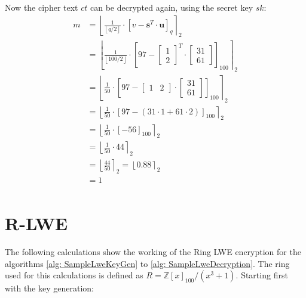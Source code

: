 Now the cipher text $ct$ can be decrypted again, using the secret key $sk$:
\begin{align*}
  m & = \left\lfloor \frac{1}{\left\lfloor q/2\right\rfloor} \cdot\left[v-\textbf{s}^T \cdot \textbf{u}\right]_{q} \right\rceil _2 \\
    & = \left\lfloor \frac{1}{\left\lfloor 100/2\right\rfloor} \cdot \left[97-
    \begin{bmatrix}
      1 \\
      2
    \end{bmatrix}^T
    \cdot
  \begin{bmatrix}
      31 \\
      61
    \end{bmatrix} \right]_{100}\right\rceil _2                                                                                       \\
    & = \left\lfloor \frac{1}{50} \cdot \left[97-
    \begin{bmatrix}
      1 & 2 
    \end{bmatrix}
    \cdot 
  \begin{bmatrix}
      31 \\ 
      61
    \end{bmatrix}\right]_{100}\right\rceil _2                                                                                        \\
    & = \left\lfloor \frac{1}{50} \cdot \left[97-(31 \cdot 1 + 61 \cdot 2)\right]_{100}\right\rceil _2                             \\
    & = \left\lfloor \frac{1}{50} \cdot \left[-56\right] _{100}\right\rceil _2                                                     \\
    & = \left\lfloor \frac{1}{50} \cdot 44\right\rceil _2                                                                          \\
    & = \left\lfloor \frac{44}{50}\right\rceil _2  = \left\lfloor 0.88\right\rceil _2                                              \\
    & = 1                                                                                                                          \\
\end{align*}

\section{R-LWE}
\label{app:RlweExampleCalc}
The following calculations show the working of the Ring LWE encryption for the algorithms \ref{alg: SampleLweKeyGen} to \ref{alg: SampleLweDecryption}. The ring used for this calculations is defined as $R=\mathbb{Z}[x]_{100}/(x^3+1)$. Starting first with the key generation:

